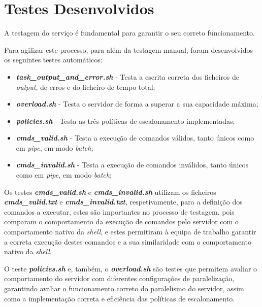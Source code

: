 \documentclass[a4paper,11pt]{scrreprt}
\begin{document}
\begin{minipage}{\textwidth}
\chapter{Testes Desenvolvidos}
    A testagem do serviço é fundamental para garantir o seu correto funcionamento.

    \vspace{1em}

    Para agilizar este processo, para além da testagem manual,
    foram desenvolvidos os seguintes testes automáticos:

    \begin{itemize}
        \item \textbf{\textit{task\_output\_and\_error.sh}} - Testa a escrita correta dos ficheiros
            de \textit{output}, de erros e do ficheiro de tempo total;
        \item \textbf{\textit{overload.sh}} - Testa o servidor de forma a superar a sua capacidade máxima;
        \item \textbf{\textit{policies.sh}} - Testa as três políticas de escalonamento implementadas;
        \item \textbf{\textit{cmds\_valid.sh}} - Testa a execução de comandos válidos, tanto únicos como
            em \textit{pipe}, em modo \textit{batch};
        \item \textbf{\textit{cmds\_invalid.sh}} - Testa a execução de comandos inválidos, tanto únicos
            como em \textit{pipe}, em modo \textit{batch};
    \end{itemize}

    \vspace{1em}

    Os testes \textbf{\textit{cmds\_valid.sh}} e \textbf{\textit{cmds\_invalid.sh}} utilizam os ficheiros
    \textbf{\textit{cmds\_valid.txt}} e \textbf{\textit{cmds\_invalid.txt}}, respetivamente, para a definição
    dos comandos a executar, estes são importantes no processo de testagem,
    pois comparam o comportamento da execução de comandos pelo servidor
    com o comportamento nativo da \textit{shell}, e estes permitiram à equipa de trabalho
    garantir a correta execução destes comandos e a sua similaridade com o comportamento
    nativo da \textit{shell}.

    \vspace{1em}

    O teste \textbf{\textit{policies.sh}} e, também, o \textbf{\textit{overload.sh}} são testes que permitem
    avaliar o comportamento do servidor com diferentes configurações de paralelização,
    garantindo avaliar o funcionamento correto do paralelismo do servidor, assim como a implementação
    correta e eficiência das políticas de escalonamento.


\end{minipage}
\end{document}
